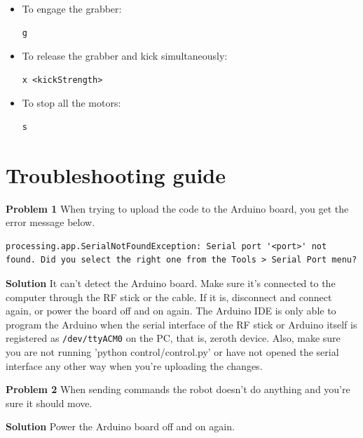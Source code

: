 \documentclass[12pt]{article}
\begin{document}
\begin{itemize}
\item To engage the grabber:
\begin{lstlisting}
g
\end{lstlisting}

\item To release the grabber and kick simultaneously:
\begin{lstlisting}
x <kickStrength>
\end{lstlisting}

\item To stop all the motors:
\begin{lstlisting}
s
\end{lstlisting}

\end{itemize}

\section{Troubleshooting guide}
\textbf{Problem 1} When trying to upload the code to the Arduino board, you get the error message below.
\begin{lstlisting}
processing.app.SerialNotFoundException: Serial port '<port>' not found. Did you select the right one from the Tools > Serial Port menu?
\end{lstlisting}

\bigskip

\textbf{Solution}  It can't detect the Arduino board. Make sure it's connected to the computer through the RF stick or the cable. If it is, disconnect and connect again, or power the board off and on again. The Arduino IDE is only able to program the Arduino when the serial interface of the RF stick or Arduino itself is registered as \texttt{/dev/ttyACM0} on the PC, that is, zeroth device. Also, make sure you are not running 'python control/control.py' or have not opened the serial interface any other way when you're uploading the changes.
\bigskip

\textbf{Problem 2} When sending commands the robot doesn't do anything and you're sure it should move.
\bigskip

\textbf{Solution} Power the Arduino board off and on again.
\end{document}
